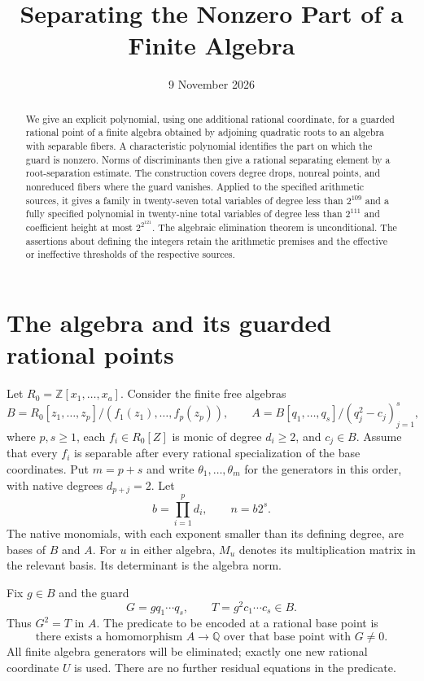 \documentclass[11pt,a4paper]{article}
\title{Separating the Nonzero Part of a Finite Algebra}
\author{}\date{9 November 2026}
\newcommand{\Q}{\mathbb Q}\newcommand{\Z}{\mathbb Z}
\begin{document}
\maketitle
\begin{abstract}
We give an explicit polynomial, using one additional rational coordinate,
for a guarded rational point of a finite algebra obtained by adjoining
quadratic roots to an algebra with separable fibers. A characteristic
polynomial identifies the part on which the guard is nonzero.
Norms of discriminants then give a rational separating element by a
root-separation estimate. The construction covers degree drops,
nonreal points, and nonreduced fibers where the guard vanishes.
Applied to the specified arithmetic sources, it gives a family in
twenty-seven total variables of degree less than $2^{109}$ and a
fully specified polynomial in twenty-nine total variables of degree
less than $2^{111}$ and coefficient height at most $2^{2^{121}}$.
The algebraic elimination theorem is unconditional. The assertions
about defining the integers retain the arithmetic premises and the
effective or ineffective thresholds of the respective sources.
\end{abstract}

\section{The algebra and its guarded rational points}

Let $R_0=\Z[x_1,\ldots,x_a]$. Consider the finite free algebras
\[
 B=R_0[z_1,\ldots,z_p]/(f_1(z_1),\ldots,f_p(z_p)),\qquad
 A=B[q_1,\ldots,q_s]/(q_j^2-c_j)_{j=1}^s ,
\]
where $p,s\ge1$, each $f_i\in R_0[Z]$ is monic of degree
$d_i\ge2$, and $c_j\in B$.
Assume that every $f_i$ is separable after every rational
specialization of the base coordinates. Put $m=p+s$ and write
$\theta_1,\ldots,\theta_m$ for the generators in this order,
with native degrees $d_{p+j}=2$. Let
\[
 b=\prod_{i=1}^p d_i,\qquad n=b2^s.
\]
The native monomials, with each exponent smaller than its defining
degree, are bases of $B$ and $A$. For $u$ in either algebra,
$M_u$ denotes its multiplication matrix in the relevant basis.
Its determinant is the algebra norm.

Fix $g\in B$ and the guard
\[
                  G=gq_1\cdots q_s,\qquad
                  T=g^2c_1\cdots c_s\in B.
\]
Thus $G^2=T$ in $A$. The predicate to be encoded at a rational
base point is
\begin{equation}\label{eq:predicate}
 \text{there exists a homomorphism }A\longrightarrow\Q
 \text{ over that base point with }G\ne0.
\end{equation}
All finite algebra generators will be eliminated; exactly one
new rational coordinate $U$ is used. There are no further residual
equations in the predicate.
\end{document}

